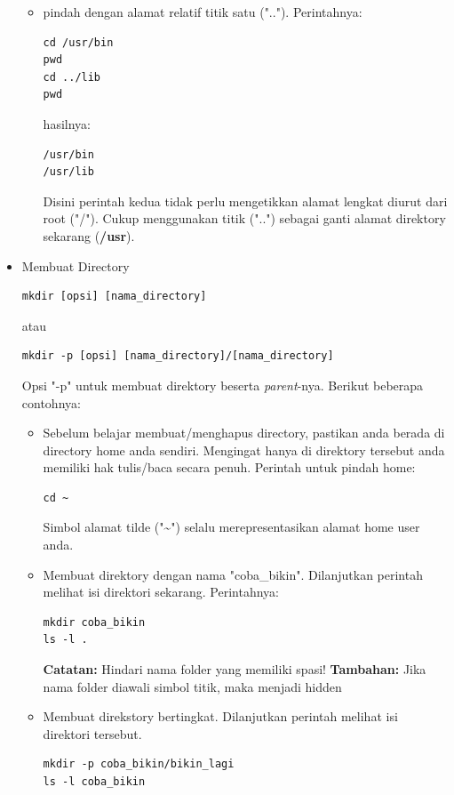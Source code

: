 \documentclass[12pt,]{article}
\begin{document}
\begin{itemize}
\begin{itemize}
			\item pindah dengan alamat relatif titik satu ("..").
			Perintahnya:
			\begin{verbatim}
cd /usr/bin
pwd
cd ../lib
pwd
			\end{verbatim}
			hasilnya:
			\begin{verbatim}
/usr/bin
/usr/lib
			\end{verbatim}
			Disini perintah kedua tidak perlu mengetikkan alamat lengkat diurut dari root ("/").
			Cukup menggunakan titik ("..") sebagai ganti alamat direktory sekarang (\textbf{/usr}).
						
		\end{itemize}
	
		\item Membuat Directory
		\begin{verbatim}
mkdir [opsi] [nama_directory]
		\end{verbatim}
		atau
		\begin{verbatim}
mkdir -p [opsi] [nama_directory]/[nama_directory]
		\end{verbatim}
		Opsi "-p" untuk membuat direktory beserta \textit{parent}-nya.
		Berikut beberapa contohnya:
		\begin{itemize}
			\item Sebelum belajar membuat/menghapus directory, pastikan anda berada di directory home anda sendiri.
			Mengingat hanya di direktory tersebut anda memiliki hak tulis/baca secara penuh.
			Perintah untuk pindah home:
			\begin{verbatim}
cd ~
			\end{verbatim}
			Simbol alamat tilde ("\textasciitilde") selalu merepresentasikan alamat home user anda.
			
			\item Membuat direktory dengan nama "coba\_bikin".
			Dilanjutkan perintah melihat isi direktori sekarang.
			Perintahnya:
			\begin{verbatim}
mkdir coba_bikin
ls -l .
			\end{verbatim}
			\textbf{Catatan:} Hindari nama folder yang memiliki spasi!
			\textbf{Tambahan:} Jika nama folder diawali simbol titik, maka menjadi hidden
			
			\item Membuat direkstory bertingkat.
			Dilanjutkan perintah melihat isi direktori tersebut.
			\begin{verbatim}
mkdir -p coba_bikin/bikin_lagi
ls -l coba_bikin
			\end{verbatim}
			

\end{itemize}
\end{itemize}
\end{document}
